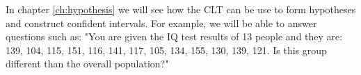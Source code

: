 In chapter \ref{ch:hypothesis} we will see how the CLT can be use to form hypotheses and construct confident intervals. For example, we will be able to answer questions such as: "You are given the IQ test results of 13 people and they are: 139, 104, 115, 151, 116, 141, 117, 105, 134, 155, 130, 139, 121.
Is this group different than the overall population?"

